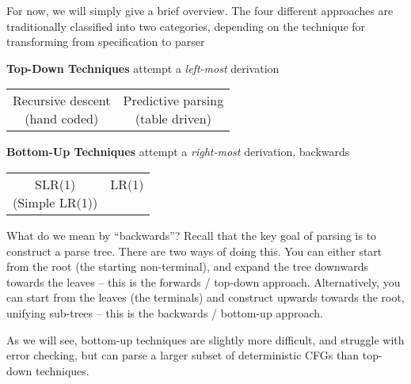 For now, we will simply give a brief overview. The four different approaches are traditionally classified into two categories, depending on the technique for transforming from specification to parser

\textbf{Top-Down Techniques} attempt a \textit{left-most} derivation
\begin{center}
\begin{tabular}{cc}
\parbox{0.2\textwidth}{\centering
  {Recursive descent}\\
 (hand coded)
} &
\parbox{0.2\textwidth}{\centering
  {Predictive parsing} \\
    (table driven)
}
\end{tabular}
\end{center}

\textbf{Bottom-Up Techniques} attempt a \textit{right-most} derivation, backwards
\begin{center}
\begin{tabular}{cc}
\parbox{0.2\textwidth}{\centering
  {SLR(1)}\\
  (Simple LR(1))
} &
\parbox{0.2\textwidth}{\centering
  {LR(1)} \\~
}
\end{tabular}
\end{center}

What do we mean by ``backwards''? Recall that the key goal of parsing is to construct a parse tree. There are two ways of doing this. You can either start from the root (the starting non-terminal), and expand the tree downwards towards the leaves -- this is the forwards / top-down approach. Alternatively, you can start from the leaves (the terminals) and construct upwards towards the root, unifying sub-trees -- this is the backwards / bottom-up approach.

As we will see, bottom-up techniques are slightly more difficult, and struggle with error checking, but can parse a larger subset of deterministic CFGs than top-down techniques.
